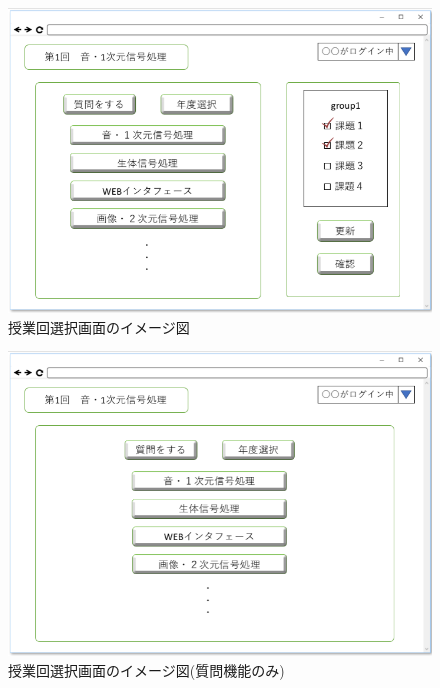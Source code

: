 \begin{figure}[phtbp]
  \begin{center}
    \includegraphics[width=1\linewidth,clip]{./img/32.png}
    \caption{授業回選択画面のイメージ図}\label{fig:32}
  \end{center}
\end{figure}

\begin{figure}[phtbp]
  \begin{center}
    \includegraphics[width=1\linewidth,clip]{./img/33.png}
    \caption{授業回選択画面のイメージ図(質問機能のみ)}\label{fig:33}
  \end{center}
\end{figure}

\newpage


